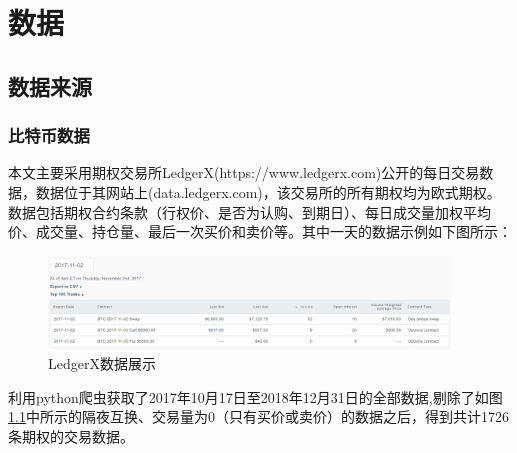 \chapter{数据}
\section{数据来源}
\subsection{比特币数据}
\par{
    
    本文主要采用期权交易所LedgerX(https://www.ledgerx.com)公开的每日交易数据，数据位于其网站上(data.ledgerx.com)，该交易所的所有期权均为欧式期权。数据包括期权合约条款（行权价、是否为认购、到期日）、每日成交量加权平均价、成交量、持仓量、最后一次买价和卖价等。其中一天的数据示例如下图所示：
    \begin{figure}[H]
        \begin{small}
            \begin{center}
                \includegraphics[width=0.95\textwidth]{figures/data_example.png}
            \end{center}
            \caption{LedgerX数据展示}
            \label{data_example}
        \end{small}
    \end{figure}
    利用python爬虫获取了2017年10月17日至2018年12月31日的全部数据,剔除了如图\ref{data_example}中所示的隔夜互换、交易量为0（只有买价或卖价）的数据之后，得到共计1726条期权的交易数据。
}
